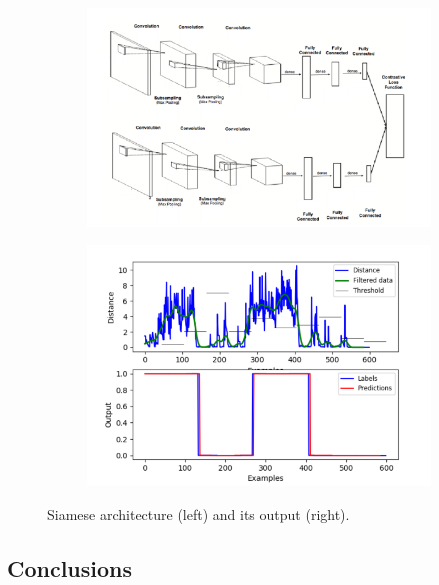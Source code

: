 \begin{figure}
	\centering
	\begin{subfigure}[b]{0.48\textwidth}
		\centering
		\includegraphics[width=\columnwidth]{img/siamese}
	\end{subfigure} 	
	\begin{subfigure}[b]{0.48\textwidth}
		\centering   
		\includegraphics[width=\columnwidth]{img/siamese_output}
	\end{subfigure} 
	\caption{Siamese architecture (left) and its output (right).}
\end{figure}

\subsection{Conclusions} 

